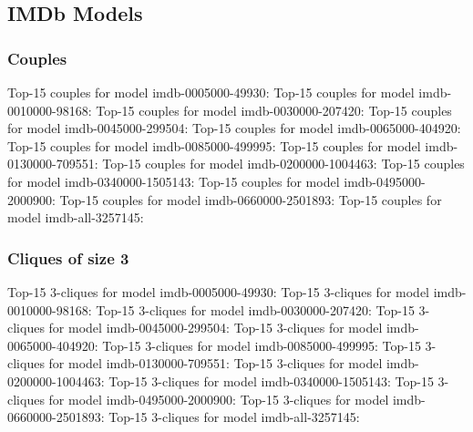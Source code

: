 \documentclass[a4paper,11pt]{article}
\newcommand{\p}[1]{\textsf{\small #1}}
\newcommand{\qr}[3]{\noindent{}Top-15 #2 for #3:{\scriptsize}}
\begin{document}
\newpage
\subsection{IMDb Models}
\label{sec:top-15:imdb-models}

\subsubsection{Couples}

\qr{imdb-0005000-49930.movies.bin.query.couples}{couples}{model \p{imdb-0005000-49930}}
\qr{imdb-0010000-98168.movies.bin.query.couples}{couples}{model \p{imdb-0010000-98168}}
\qr{imdb-0030000-207420.movies.bin.query.couples}{couples}{model \p{imdb-0030000-207420}}
\qr{imdb-0045000-299504.movies.bin.query.couples}{couples}{model \p{imdb-0045000-299504}}
\qr{imdb-0065000-404920.movies.bin.query.couples}{couples}{model \p{imdb-0065000-404920}}
\qr{imdb-0085000-499995.movies.bin.query.couples}{couples}{model \p{imdb-0085000-499995}}
\qr{imdb-0130000-709551.movies.bin.query.couples}{couples}{model \p{imdb-0130000-709551}}
\qr{imdb-0200000-1004463.movies.bin.query.couples}{couples}{model \p{imdb-0200000-1004463}}
\qr{imdb-0340000-1505143.movies.bin.query.couples}{couples}{model \p{imdb-0340000-1505143}}
\qr{imdb-0495000-2000900.movies.bin.query.couples}{couples}{model \p{imdb-0495000-2000900}}
\qr{imdb-0660000-2501893.movies.bin.query.couples}{couples}{model \p{imdb-0660000-2501893}}
\qr{imdb-all-3257145.movies.bin.query.couples}{couples}{model \p{imdb-all-3257145}}


\newpage
\subsubsection{Cliques of size 3}

\qr{imdb-0005000-49930.movies.bin.query.triples}{3-cliques}{model \p{imdb-0005000-49930}}
\qr{imdb-0010000-98168.movies.bin.query.triples}{3-cliques}{model \p{imdb-0010000-98168}}
\qr{imdb-0030000-207420.movies.bin.query.triples}{3-cliques}{model \p{imdb-0030000-207420}}
\qr{imdb-0045000-299504.movies.bin.query.triples}{3-cliques}{model \p{imdb-0045000-299504}}
\qr{imdb-0065000-404920.movies.bin.query.triples}{3-cliques}{model \p{imdb-0065000-404920}}
\qr{imdb-0085000-499995.movies.bin.query.triples}{3-cliques}{model \p{imdb-0085000-499995}}
\qr{imdb-0130000-709551.movies.bin.query.triples}{3-cliques}{model \p{imdb-0130000-709551}}
\qr{imdb-0200000-1004463.movies.bin.query.triples}{3-cliques}{model \p{imdb-0200000-1004463}}
\qr{imdb-0340000-1505143.movies.bin.query.triples}{3-cliques}{model \p{imdb-0340000-1505143}}
\qr{imdb-0495000-2000900.movies.bin.query.triples}{3-cliques}{model \p{imdb-0495000-2000900}}
\qr{imdb-0660000-2501893.movies.bin.query.triples}{3-cliques}{model \p{imdb-0660000-2501893}}
\qr{imdb-all-3257145.movies.bin.query.triples}{3-cliques}{model \p{imdb-all-3257145}}
\end{document}
